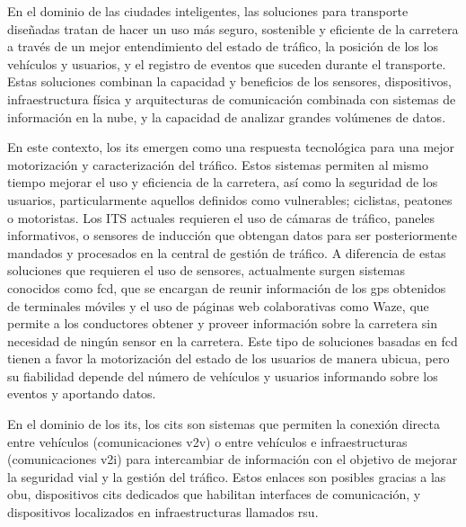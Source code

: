 En el dominio de las ciudades inteligentes, las soluciones para transporte diseñadas tratan de hacer un uso más seguro, sostenible y eficiente de la carretera a través de un mejor entendimiento del estado de tráfico, la posición de los los vehículos y usuarios, y el
registro de eventos que suceden durante el transporte. Estas soluciones combinan la capacidad y beneficios de los sensores, dispositivos, infraestructura física y arquitecturas de comunicación combinada con sistemas de información en la nube, y la capacidad de analizar grandes volúmenes de datos.

En este contexto, los \gls{its} emergen como una respuesta tecnológica para una mejor motorización y caracterización del tráfico. Estos sistemas permiten al mismo tiempo mejorar el uso y eficiencia de la carretera, así como la seguridad de los usuarios, particularmente aquellos definidos como vulnerables; ciclistas, peatones o motoristas. Los ITS actuales requieren el uso de cámaras de tráfico, paneles informativos, o sensores de inducción que obtengan datos para ser posteriormente mandados y procesados en la central de gestión de tráfico. A diferencia de estas soluciones que requieren el uso de sensores, actualmente surgen sistemas conocidos como \gls{fcd}, que se encargan de reunir información de los \gls{gps} obtenidos de terminales móviles y el uso de páginas web colaborativas como Waze, que permite a los conductores obtener y proveer información sobre la carretera sin necesidad de ningún sensor en la carretera. Este tipo de soluciones basadas en \gls{fcd} tienen a favor la motorización del estado de los usuarios de manera ubicua, pero su fiabilidad depende del número de vehículos y usuarios informando sobre los eventos y aportando datos.

En el dominio de los \gls{its}, los \gls{cits} son sistemas que permiten la conexión directa entre vehículos (comunicaciones \gls{v2v}) o entre vehículos e infraestructuras (comunicaciones \gls{v2i}) para intercambiar de información con el objetivo de mejorar la seguridad vial y la gestión del tráfico. Estos enlaces son posibles gracias a las \gls{obu}, dispositivos \gls{cits} dedicados que habilitan interfaces de comunicación, y dispositivos localizados en infraestructuras llamados \gls{rsu}.

